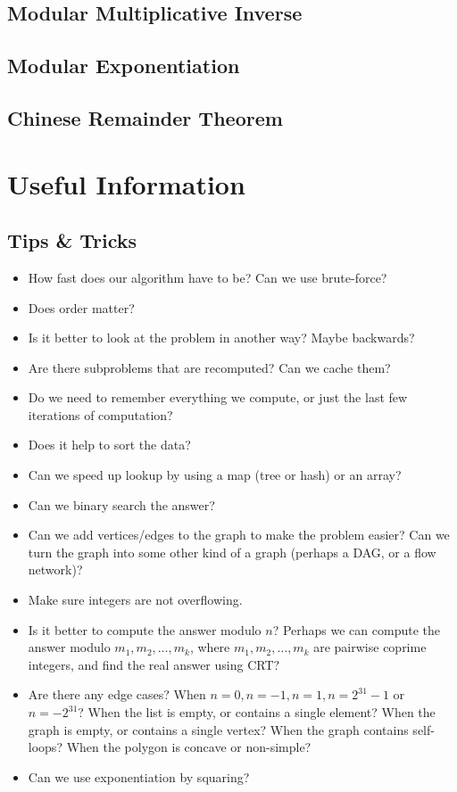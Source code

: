 \documentclass[11pt,a4paper,titlepage]{article}
\begin{document}
		\subsection{Modular Multiplicative Inverse}
			

		\subsection{Modular Exponentiation}
			

		\subsection{Chinese Remainder Theorem}
			

	\section{Useful Information}

		\subsection{Tips \&{} Tricks}
			\begin{itemize}
				\item How fast does our algorithm have to be? Can we use brute-force?
				\item Does order matter?
				\item Is it better to look at the problem in another way? Maybe backwards?
				\item Are there subproblems that are recomputed? Can we cache them?
				\item Do we need to remember everything we compute, or just the last few iterations of computation?
				\item Does it help to sort the data?
				\item Can we speed up lookup by using a map (tree or hash) or an array?
				\item Can we binary search the answer?
				\item Can we add vertices/edges to the graph to make the problem easier? Can we turn the graph into some other kind of a graph (perhaps a DAG, or a flow network)?
				\item Make sure integers are not overflowing.
				\item Is it better to compute the answer modulo $n$? Perhaps we can compute the answer modulo $m_1,m_2,\ldots,m_k$, where $m_1,m_2,\ldots,m_k$ are pairwise coprime integers, and find the real answer using CRT?
				\item Are there any edge cases? When $n=0, n=-1, n=1, n=2^{31}-1$ or $n=-2^{31}$? When the list is empty, or contains a single element? When the graph is empty, or contains a single vertex? When the graph contains self-loops?  When the polygon is concave or non-simple?
				\item Can we use exponentiation by squaring?
			\end{itemize}
\end{document}
